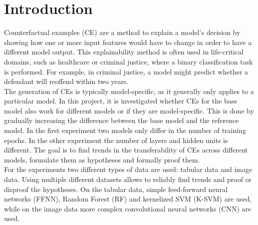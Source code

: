 \documentclass{article}
\begin{document}
\section{Introduction}
Counterfactual examples (CE) are a method to explain a model's decision by showing how one or more input features would have to change in order to have a different model output. This explainability method is often used in life-critical domains, such as healthcare or criminal justice, where a binary classification task is performed. For example, in criminal justice, a model might predict whether a defendant will reoffend within two years. \\
The generation of CEs is typically model-specific, as it generally only applies to a particular model. In this project, it is investigated whether CEs for the base model also work for different models or if they are model-specific. This is done by gradually increasing the difference between the base model and the reference model. In the first experiment two models only differ in the number of training epochs. In the other experiment the number of layers and hidden units is different. The goal is to find trends in the transferability of CEs across different models, formulate them as hypotheses and formally proof them. \\
For the experiments two different types of data are used: tabular data and image data. Using multiple different datasets allows to reliably find trends and proof or disproof the hypotheses. On the tabular data, simple feed-forward neural networks (FFNN), Random Forest (RF) and kernelized SVM (K-SVM) are used, while on the image data more complex convolutional neural networks (CNN) are used. \\
\end{document}

